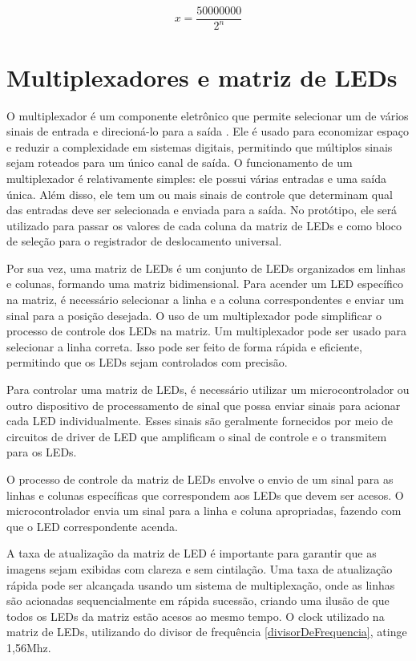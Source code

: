 \begin{equation} \label{Formula}
    x=\frac{50000000}{2^n}
\end{equation}

\section{Multiplexadores e matriz de LEDs}
O multiplexador é um componente eletrônico que permite selecionar um de vários sinais de entrada e direcioná-lo para a saída \cite{floyd}. Ele é usado para economizar espaço e reduzir a complexidade em sistemas digitais, permitindo que múltiplos sinais sejam roteados para um único canal de saída. O funcionamento de um multiplexador é relativamente simples: ele possui várias entradas e uma saída única. Além disso, ele tem um ou mais sinais de controle que determinam qual das entradas deve ser selecionada e enviada para a saída. No protótipo, ele será utilizado para passar os valores de cada coluna da matriz de LEDs e como bloco de seleção para o registrador de deslocamento universal. 

Por sua vez, uma matriz de LEDs é um conjunto de LEDs organizados em linhas e colunas, formando uma matriz bidimensional. Para acender um LED específico na matriz, é necessário selecionar a linha e a coluna correspondentes e enviar um sinal para a posição desejada. O uso de um multiplexador pode simplificar o processo de controle dos LEDs na matriz. Um multiplexador pode ser usado para selecionar a linha correta. Isso pode ser feito de forma rápida e eficiente, permitindo que os LEDs sejam controlados com precisão.

Para controlar uma matriz de LEDs, é necessário utilizar um microcontrolador ou outro dispositivo de processamento de sinal que possa enviar sinais para acionar cada LED individualmente. Esses sinais são geralmente fornecidos por meio de circuitos de driver de LED que amplificam o sinal de controle e o transmitem para os LEDs.

O processo de controle da matriz de LEDs envolve o envio de um sinal para as linhas e colunas específicas que correspondem aos LEDs que devem ser acesos. O microcontrolador envia um sinal para a linha e coluna apropriadas, fazendo com que o LED correspondente acenda.

A taxa de atualização da matriz de LED é importante para garantir que as imagens sejam exibidas com clareza e sem cintilação. Uma taxa de atualização rápida pode ser alcançada usando um sistema de multiplexação, onde as linhas são acionadas sequencialmente em rápida sucessão, criando uma ilusão de que todos os LEDs da matriz estão acesos ao mesmo tempo. O clock utilizado na matriz de LEDs, utilizando do divisor de frequência \ref{divisorDeFrequencia}, atinge 1,56Mhz.

